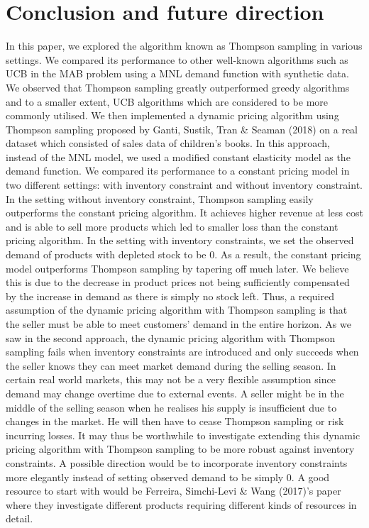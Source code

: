 \documentclass[a4paper]{article}
\begin{document}
\section{Conclusion and future direction}
In this paper, we explored the algorithm known as Thompson sampling in various settings. We compared its performance to other well-known algorithms such as UCB in the MAB problem using a MNL demand function with synthetic data. We observed that Thompson sampling greatly outperformed greedy algorithms and to a smaller extent, UCB algorithms which are considered to be more commonly utilised. 
\newline
\newline
We then implemented a dynamic pricing algorithm using Thompson sampling proposed by Ganti, Sustik, Tran \& Seaman (2018) on a real dataset which consisted of sales data of children's books. In this approach, instead of the MNL model, we used a modified constant elasticity model as the demand function. We compared its performance to a constant pricing model in two different settings: with inventory constraint and without inventory constraint. In the setting  without inventory constraint, Thompson sampling easily outperforms the constant pricing algorithm. It achieves higher revenue at less cost and is able to sell more products which led to smaller loss than the constant pricing algorithm. In the setting with inventory constraints, we set the observed demand of products with depleted stock to be 0. As a result, the constant pricing model outperforms Thompson sampling by tapering off much later. We believe this is due to the decrease in product prices not being sufficiently compensated by the increase in demand as there is simply no stock left. Thus, a required assumption of the dynamic pricing algorithm with Thompson sampling is that the seller must be able to meet customers' demand in the entire horizon.
\newline
\newline
As we saw in the second approach, the dynamic pricing algorithm with Thompson sampling fails when inventory constraints are introduced and only succeeds when the seller knows they can meet market demand during the selling season. In certain real world markets, this may not be a very flexible assumption since demand may change overtime due to external events. A seller might be in the middle of the selling season when he realises his supply is insufficient due to changes in the market. He will then have to cease Thompson sampling or risk incurring losses. It may thus be worthwhile to investigate extending this dynamic pricing algorithm with Thompson sampling to be more robust against inventory constraints. A possible direction would be to incorporate inventory constraints more elegantly instead of setting observed demand to be simply 0. A good resource to start with would be Ferreira, Simchi-Levi \& Wang (2017)'s paper where they investigate different products requiring different kinds of resources in detail.
\newpage
\end{document}
